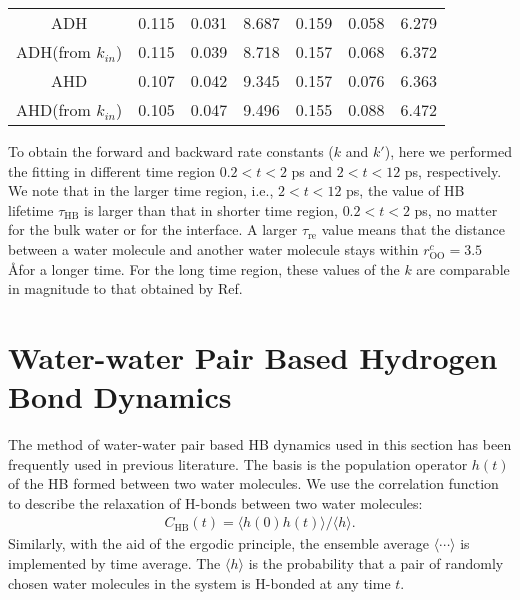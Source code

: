 {\begin{table}[htb]
\begin{tabular}{ccccccc}
  ADH & 0.115 & 0.031 & 8.687 & 0.159 & 0.058 & 6.279 \\
  ADH(from $k_{in}$) & 0.115  & 0.039 & 8.718 & 0.157  & 0.068 & 6.372\\
  AHD & 0.107 & 0.042 & 9.345  & 0.157 & 0.076 & 6.363 \\
  AHD(from $k_{in}$) & 0.105  & 0.047 & 9.496 & 0.155  & 0.088 & 6.472 \\
\end{tabular}
\end{table}
% 

To obtain the forward and backward rate constants ($k$ and $k'$),
here we performed the fitting in different time region $0.2 < t < 2$ ps and $2 < t < 12$ ps, respectively.
We note that in the larger time region, i.e., $2 < t < 12$ ps, the value of HB lifetime $\tau_\text{HB}$ is larger than that in shorter time region, $0.2 < t < 2$ ps,
no matter for the bulk water or for the interface. A larger $\tau_\text{re}$ value means that the distance between a water molecule and another water molecule 
stays within $r_\text{OO}^c= 3.5$ \AA for a longer time. 
For the long time region, these values of the $k$ are comparable in magnitude to that obtained by Ref. 


\section{Water-water Pair Based Hydrogen Bond Dynamics}
The method of water-water pair based HB dynamics used in this section has been frequently used in previous literature.\cite{Luzar1994,AL96,AC00} 
The basis is the population operator $h(t)$ of the HB formed between two water molecules. 
We use the correlation function \CHB to describe the relaxation of H-bonds between two water molecules: 
\begin{eqnarray}
C_{\text{HB}}(t)=\langle h(0)h(t) \rangle/\langle h\rangle
\label{eq:C_HB}.
\end{eqnarray}
Similarly, with the aid of the ergodic principle, the ensemble average $\langle \cdots\rangle$ is implemented by time average.
The $\langle h\rangle$ is the probability that a pair of randomly chosen water molecules in the system is
H-bonded at any time $t$. 

}
